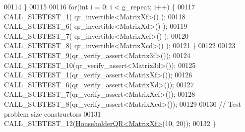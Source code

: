 \begin{DoxyCode}
00114   \}
00115 
00116   \textcolor{keywordflow}{for}(\textcolor{keywordtype}{int} i = 0; i < g\_repeat; i++) \{
00117     CALL\_SUBTEST\_1( qr\_invertible<MatrixXf>() );
00118     CALL\_SUBTEST\_6( qr\_invertible<MatrixXd>() );
00119     CALL\_SUBTEST\_7( qr\_invertible<MatrixXcf>() );
00120     CALL\_SUBTEST\_8( qr\_invertible<MatrixXcd>() );
00121   \}
00122 
00123   CALL\_SUBTEST\_9(qr\_verify\_assert<Matrix3f>());
00124   CALL\_SUBTEST\_10(qr\_verify\_assert<Matrix3d>());
00125   CALL\_SUBTEST\_1(qr\_verify\_assert<MatrixXf>());
00126   CALL\_SUBTEST\_6(qr\_verify\_assert<MatrixXd>());
00127   CALL\_SUBTEST\_7(qr\_verify\_assert<MatrixXcf>());
00128   CALL\_SUBTEST\_8(qr\_verify\_assert<MatrixXcd>());
00129 
00130   \textcolor{comment}{// Test problem size constructors}
00131   CALL\_SUBTEST\_12(\hyperlink{group___q_r___module_class_eigen_1_1_householder_q_r}{HouseholderQR<MatrixXf>}(10, 20));
00132 \}
\end{DoxyCode}
